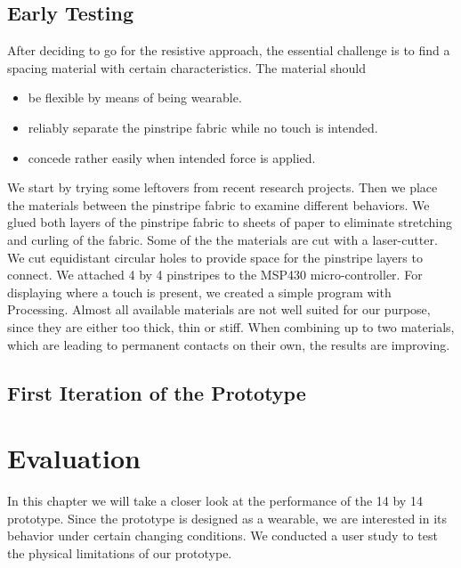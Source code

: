 \section{Early Testing}
After deciding to go for the resistive approach, the essential challenge is to find a spacing material with certain characteristics. The material should
\begin{itemize}
\item be flexible by means of being wearable.
\item reliably separate the pinstripe fabric while no touch is intended.
\item concede rather easily when intended force is applied.
\end{itemize}
We start by trying some leftovers from recent research projects. 
Then we place the materials between the pinstripe fabric to examine different behaviors. We glued both layers of the pinstripe fabric to sheets of paper to eliminate stretching and curling of the fabric. Some of the the materials are cut with a laser-cutter. We cut equidistant circular holes to provide space for the pinstripe layers to connect. We attached 4 by 4 pinstripes to the MSP430 micro-controller. For displaying where a touch is present, we created a simple program with Processing.
Almost all available materials are not well suited for our purpose, since they are either too thick, thin or stiff. When combining up to two materials, which are leading to permanent contacts on their own, the results are improving. 

\section{First Iteration of the Prototype}



\chapter{Evaluation}
In this chapter we will take a closer look at the performance of the 14 by 14 prototype. Since the prototype is designed as a wearable, we are interested in its behavior under certain changing conditions. We conducted a user study to test the physical limitations of our prototype. 

